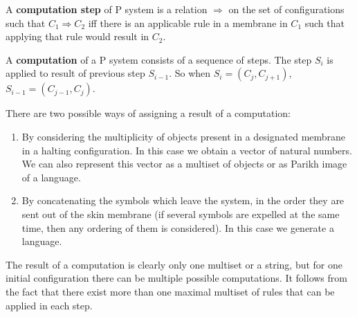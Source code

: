 

A {\bf computation step} of P system is a relation $\Rightarrow$ on the set of configurations such that $C_1 \Rightarrow C_2$ iff there is an applicable rule in a membrane in $C_1$ such that applying that rule would result in $C_2$.

A {\bf computation} of a P system consists of a sequence of steps. The step $S_i$ is applied to result of previous step $S_{i-1}$. So when $S_i = (C_j,C_{j+1})$, $S_{i-1} = (C_{j-1},C_j)$.


There are two possible ways of assigning a result of a computation:

\begin{enumerate}
    \item By considering the multiplicity of objects present in a designated membrane in a halting configuration. In this case we obtain a vector of natural numbers. We can also represent this vector as a multiset of objects or as Parikh image of a language.
    \item By concatenating the symbols which leave the system, in the order they are sent out of the skin membrane (if several symbols are expelled at the same time, then any ordering of them is considered). In this case we generate a language.
\end{enumerate}

The result of a computation is clearly only one multiset or a string, but for one initial configuration there can be multiple possible computations. It follows from the fact that there exist more than one maximal multiset of rules that can be applied in each step.